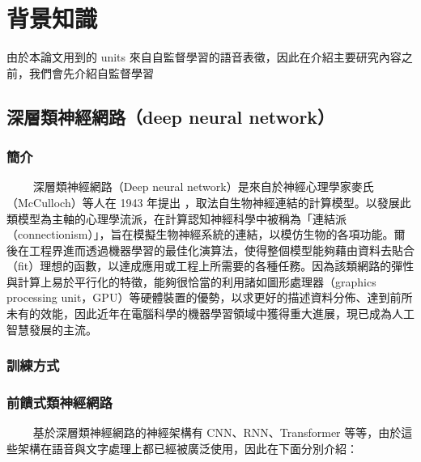 

\chapter{背景知識}

由於本論文用到的 units 來自自監督學習的語音表徵，因此在介紹主要研究內容之前，我們會先介紹自監督學習 


\section{深層類神經網路（deep neural network）}

\subsection{簡介}

　　
深層類神經網路（Deep neural network）是來自於神經心理學家麥氏（McCulloch）等人在 1943 年提出 \cite{mcculloch1943logical}，取法自生物神經連結的計算模型。以發展此類模型為主軸的心理學流派，在計算認知神經科學中被稱為「連結派（connectionism）」，旨在模擬生物神經系統的連結，以模仿生物的各項功能。爾後在工程界進而透過機器學習的最佳化演算法，使得整個模型能夠藉由資料去貼合（fit）理想的函數，以達成應用或工程上所需要的各種任務。因為該類網路的彈性與計算上易於平行化的特徵，能夠很恰當的利用諸如圖形處理器（graphics processing unit，GPU）等硬體裝置的優勢，以求更好的描述資料分佈、達到前所未有的效能，因此近年在電腦科學的機器學習領域中獲得重大進展，現已成為人工智慧發展的主流。




\subsection{訓練方式}

\subsection{前饋式類神經網路}　　
基於深層類神經網路的神經架構有 CNN、RNN、Transformer 等等，由於這些架構在語音與文字處理上都已經被廣泛使用，因此在下面分別介紹：

